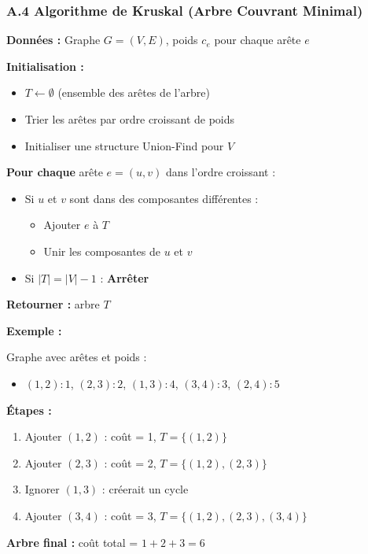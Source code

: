 \documentclass[12pt,a4paper]{article}
\begin{document}
\newpage
\subsubsection*{A.4 Algorithme de Kruskal (Arbre Couvrant Minimal)}

\begin{algorithme}
\textbf{Données :} Graphe $G = (V, E)$, poids $c_e$ pour chaque arête $e$

\textbf{Initialisation :}
\begin{itemize}
    \item $T \leftarrow \emptyset$ (ensemble des arêtes de l'arbre)
    \item Trier les arêtes par ordre croissant de poids
    \item Initialiser une structure Union-Find pour $V$
\end{itemize}

\textbf{Pour chaque} arête $e = (u,v)$ dans l'ordre croissant :
\begin{itemize}
    \item Si $u$ et $v$ sont dans des composantes différentes :
    \begin{itemize}
        \item Ajouter $e$ à $T$
        \item Unir les composantes de $u$ et $v$
    \end{itemize}
    \item Si $|T| = |V| - 1$ : \textbf{Arrêter}
\end{itemize}

\textbf{Retourner :} arbre $T$
\end{algorithme}

\begin{exemple}
\textbf{Exemple :}

Graphe avec arêtes et poids :
\begin{itemize}
    \item $(1,2): 1$, $(2,3): 2$, $(1,3): 4$, $(3,4): 3$, $(2,4): 5$
\end{itemize}

\textbf{Étapes :}
\begin{enumerate}
    \item Ajouter $(1,2)$ : coût = 1, $T = \{(1,2)\}$
    \item Ajouter $(2,3)$ : coût = 2, $T = \{(1,2), (2,3)\}$
    \item Ignorer $(1,3)$ : créerait un cycle
    \item Ajouter $(3,4)$ : coût = 3, $T = \{(1,2), (2,3), (3,4)\}$
\end{enumerate}

\textbf{Arbre final :} coût total = $1 + 2 + 3 = 6$
\end{exemple}
\end{document}
